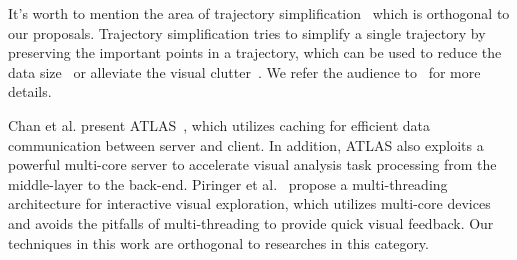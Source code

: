 It's worth to mention the area of trajectory simplification~\cite{zhang2018trajectory, 2018arXiv180303550V} which is orthogonal to our proposals. Trajectory simplification tries to simplify a single trajectory by preserving the important points in a trajectory, which can be used to reduce the data size~\cite{zhang2018trajectory} or alleviate  the visual clutter~\cite{borcan2012improving, 6851202}. We refer the audience to~\cite{zhang2018trajectory} for more details. 

Chan et al. present ATLAS~\cite{chan2008maintaining}, which utilizes caching for efficient data communication between server and client.
In addition, ATLAS also exploits a powerful multi-core server to accelerate visual analysis task processing from the middle-layer to the back-end.
Piringer et al.~\cite{piringer2009multi} propose a multi-threading architecture for interactive visual exploration,
which utilizes multi-core devices and avoids the pitfalls of multi-threading to provide quick visual feedback.
{Our} techniques in this work are orthogonal to researches in this category.

